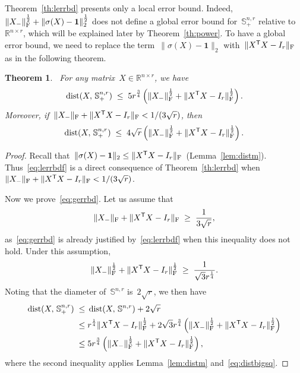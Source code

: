 \documentclass[11pt,a4paper]{article}  %
\newtheorem{theorem}{Theorem}%
\theoremstyle{definition}
\DeclareMathOperator{\dist}{dist}
\newcommand{\RR}{\mathbb{R}}
\newcommand{\col}{r}
\newcommand{\stf}[1]{\mathbb{S}^{#1}}
\newcommand{\fro}{{\scriptstyle{\textnormal{F}}}}
\newcommand{\trs}{{\scriptstyle{\mathsf{T}}}}
\newcommand{\ones}{\mathbf{1}}
\begin{document}
    Theorem~\ref{th:lerrbd} presents only a local error bound.
    Indeed,~$\|X_{-}\|_{\fro}^{\frac{1}{2}} + \|\sigma(X)-\ones\|_2^{\frac{1}{2}}$
    does not define a global error
    bound for~$\stf{n,\col}_+$ relative to~$\RR^{n\times \col}$,
    which will be explained later by Theorem~\ref{th:power}.
    To have a global error bound, we need to replace the term~$\|\sigma(X)-\ones\|_2$
    with~$\|X^\trs X - I_\col\|_\fro$ as in the following theorem. %
    \begin{theorem}\label{th:errbd}~For any matrix~$X\in \RR^{n\times \col}$, we have
    \begin{equation}
        \label{eq:gerrbd}
        \dist(X,\, \stf{n,\col}_+) \;\le\;
        5\col^{\frac{3}{4}}  \left(\|X_{-}\|_\fro^{\frac{1}{2}} + \|X^\trs X - I_\col\|_\fro^{\frac{1}{2}} \right).
    \end{equation}
    Moreover, if~$\|X_{-}\|_\fro + \|X^\trs X -I_\col\|_\fro < 1/(3\sqrt{\col})$, then
    \begin{equation}
        \label{eq:lerrbdf}
        \dist(X,\, \stf{n,\col}_+) \;\le\;
        4\sqrt{\col}  \left(\|X_{-}\|_\fro^{\frac{1}{2}}  + \|X^\trs X - I_\col\|_\fro^{\frac{1}{2}} \right).
    \end{equation}
\end{theorem}
\begin{proof}
    Recall that~$\|\sigma(X) - \ones\|_2 \le \|X^\trs X - I_\col\|_\fro$~(Lemma~\ref{lem:distm}).
    Thus~\eqref{eq:lerrbdf} is a direct consequence of Theorem~\ref{th:lerrbd}
    when~$\|X_{-}\|_\fro + \|X^\trs X -I_\col\|_\fro < 1/(3\sqrt{\col})$.

    Now we prove~\eqref{eq:gerrbd}. Let us assume that
\begin{equation}
    \nonumber
    \|X_{-}\|_{\fro} + \|X^\trs X -I_\col\|_\fro \;\ge\; \frac{1}{3\sqrt{\col}},
\end{equation}
as~\eqref{eq:gerrbd} is already justified by~\eqref{eq:lerrbdf} when this inequality does not hold.
Under this assumption,
\begin{equation}
    \label{eq:distbigsq}
        \|X_{-}\|_{\fro}^\frac{1}{2} + \|X^\trs X -I_\col\|_\fro^{\frac{1}{2}} \;\ge\;
    \frac{1}{\sqrt{3}\col^{\frac{1}{4}}}.
\end{equation}
Noting that the diameter of~$\stf{n,\col}$ is~$2\sqrt{\col}$, we then have
\begin{equation}
    \label{eq:nonlocal}
\begin{split}
    \dist(X,\, \stf{n,\col}_+) \;\le\; & \dist(X,\, \stf{n,\col}) + 2\sqrt{\col}  \\
    \;\le\; &
    \col^{\frac{1}{4}} \|X^\trs X -I_\col\|_\fro^{\frac{1}{2}}
    + 2\sqrt{3} \col^{\frac{3}{4}}
    \left( \|X_{-}\|_{\fro}^{\frac{1}{2}} + \|X^\trs X -I_\col\|_\fro^{\frac{1}{2}} \right)\\
    \;\le\; & 5\col^{\frac{3}{4}}  \left(\|X_{-}\|_\fro^{\frac{1}{2}} + \|X^\trs
    X - I_\col\|_\fro^{\frac{1}{2}} \right),
\end{split}
\end{equation}
where the second inequality applies Lemma~\ref{lem:distm} and~\eqref{eq:distbigsq}.
\end{proof}
\end{document}
